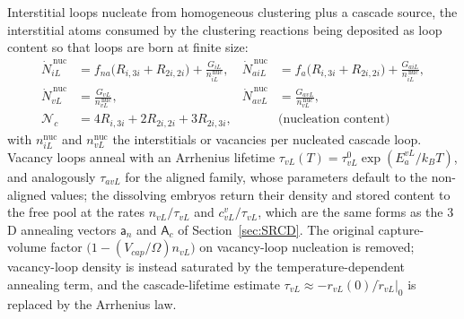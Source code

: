 \documentclass{article}
\newcommand{\spvec}[1]{\bm{\mathsf{#1}}}   %
\begin{document}
Interstitial loops nucleate from homogeneous clustering plus a cascade source, the
interstitial atoms consumed by the clustering reactions being deposited as loop
content so that loops are born at finite size:
\begin{align}
\dot N_{iL}^{\,\mathrm{nuc}}&=f_{na}\bigl(R_{i,3i}+R_{2i,2i}\bigr)+\frac{G_{iL}}{n_{iL}^{\,\mathrm{nuc}}}, &
\dot N_{aiL}^{\,\mathrm{nuc}}&=f_{a}\bigl(R_{i,3i}+R_{2i,2i}\bigr)+\frac{G_{aiL}}{n_{iL}^{\,\mathrm{nuc}}},\\
\dot N_{vL}^{\,\mathrm{nuc}}&=\frac{G_{vL}}{n_{vL}^{\,\mathrm{nuc}}}, &
\dot N_{avL}^{\,\mathrm{nuc}}&=\frac{G_{avL}}{n_{vL}^{\,\mathrm{nuc}}},\\
\mathcal{N}_c&=4R_{i,3i}+2R_{2i,2i}+3R_{2i,3i}, & & \text{(nucleation content)}
\end{align}
with $n_{iL}^{\mathrm{nuc}}$ and $n_{vL}^{\mathrm{nuc}}$ the interstitials or
vacancies per nucleated cascade loop. Vacancy loops anneal with an Arrhenius
lifetime $\tau_{vL}(T)=\tau_{vL}^{0}\exp(E_a^{vL}/k_BT)$, and analogously
$\tau_{avL}$ for the aligned family, whose parameters default to the non-aligned
values; the dissolving embryos return their density and stored content to the free
pool at the rates $n_{vL}/\tau_{vL}$ and $c_{vL}^{v}/\tau_{vL}$, which are the same
forms as the $3$D annealing vectors $\spvec{a}_n$ and $\spvec{A}_c$ of
Section~\ref{sec:SRCD}. The original capture-volume factor
$\bigl(1-(V_{cap}/\Omega)n_{vL}\bigr)$ on vacancy-loop nucleation is removed;
vacancy-loop density is instead saturated by the temperature-dependent annealing
term, and the cascade-lifetime estimate $\tau_{vL}\approx-r_{vL}(0)/\dot r_{vL}|_0$
is replaced by the Arrhenius law.
\end{document}
